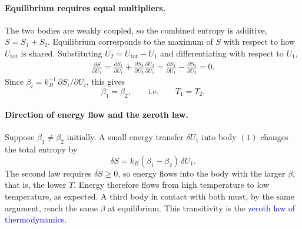 \paragraph{Equilibrium requires equal multipliers.}
The two bodies are weakly coupled, so the combined entropy is additive,
$S=S_1+S_2$. Equilibrium corresponds to the maximum of $S$ with respect to
how $U_{\text{tot}}$ is shared. Substituting $U_2=U_{\text{tot}}-U_1$ and
differentiating with respect to $U_1$,
\begin{align*}
    \frac{\partial S}{\partial U_1}
    = \frac{\partial S_1}{\partial U_1}
    +\frac{\partial S_2}{\partial U_2}\frac{\partial U_2}{\partial U_1}
    = \frac{\partial S_1}{\partial U_1}-\frac{\partial S_2}{\partial U_2}=0.
\end{align*}
Since $\beta_i=k_B^{-1}\,\partial S_i/\partial U_i$, this gives
\begin{equation}
    \boxed{\beta_1=\beta_2, \qquad\text{i.e.}\qquad T_1=T_2.}
\end{equation}

\paragraph{Direction of energy flow and the zeroth law.}
Suppose $\beta_1\neq\beta_2$ initially. A small energy transfer $\delta U_1$
into body $(1)$ changes the total entropy by
\begin{equation*}
    \delta S = k_B(\beta_1-\beta_2)\,\delta U_1.
\end{equation*}
The second law requires $\delta S\geq0$, so energy flows into the body with
the larger $\beta$, that is, the lower $T$. Energy therefore flows from high
temperature to low temperature, as expected. A third body in contact with
both must, by the same argument, reach the same $\beta$ at equilibrium. This
transitivity is the \textcolor{blue}{zeroth law of thermodynamics}.

